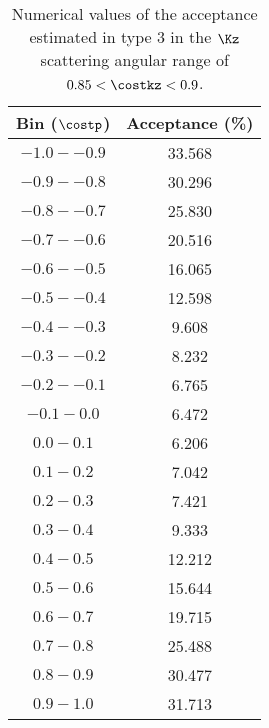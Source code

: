 \begin{table}[!h] 
  \begin{center}
  \caption{Numerical values of the acceptance estimated in type 3 in the $\Kz$ scattering angular range of \textbf{$0.85<\costkz<0.9$}.}
  \centering
  \begin{threeparttable}
    \begin{tabular}{cc}
    Bin ($\costp$) & Acceptance (\%) \\
    \midrule\midrule
    $-1.0 - -0.9$ & 33.568 \\
    \midrule
    $-0.9 - -0.8$ & 30.296 \\
    \midrule
    $-0.8 - -0.7$ & 25.830 \\
    \midrule
    $-0.7 - -0.6$ & 20.516 \\
    \midrule
    $-0.6 - -0.5$ & 16.065 \\
    \midrule
    $-0.5 - -0.4$ & 12.598 \\
    \midrule
    $-0.4 - -0.3$ & 9.608 \\
    \midrule
    $-0.3 - -0.2$ & 8.232 \\
    \midrule
    $-0.2 - -0.1$ & 6.765 \\
    \midrule
    $-0.1 - 0.0$ & 6.472 \\
    \midrule
    $0.0 - 0.1$ & 6.206 \\
    \midrule
    $0.1 - 0.2$ & 7.042 \\
    \midrule
    $0.2 - 0.3$ & 7.421 \\
    \midrule
    $0.3 - 0.4$ & 9.333 \\
    \midrule
    $0.4 - 0.5$ & 12.212 \\
    \midrule
    $0.5 - 0.6$ & 15.644 \\
    \midrule
    $0.6 - 0.7$ & 19.715 \\
    \midrule
    $0.7 - 0.8$ & 25.488 \\
    \midrule
    $0.8 - 0.9$ & 30.477 \\
    \midrule
    $0.9 - 1.0$ & 31.713 \\
    \end{tabular}
  \end{threeparttable}
  \label{tab-Pl-acc_37}
  \end{center}
\end{table}

